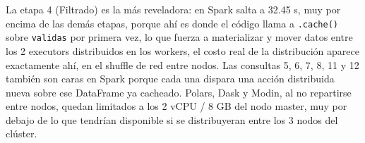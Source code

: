 La etapa 4 (Filtrado) es la más reveladora: en Spark salta a 32.45 s, muy por encima de las demás etapas, porque ahí es donde el código llama a \texttt{.cache()} sobre \texttt{validas} por primera vez, lo que fuerza a materializar y mover datos entre los 2 executors distribuidos en los workers, el costo real de la distribución aparece exactamente ahí, en el shuffle de red entre nodos. Las consultas 5, 6, 7, 8, 11 y 12 también son caras en Spark porque cada una dispara una acción distribuida nueva sobre ese DataFrame ya cacheado. Polars, Dask y Modin, al no repartirse entre nodos, quedan limitados a los 2 vCPU / 8 GB del nodo master, muy por debajo de lo que tendrían disponible si se distribuyeran entre los 3 nodos del clúster.
